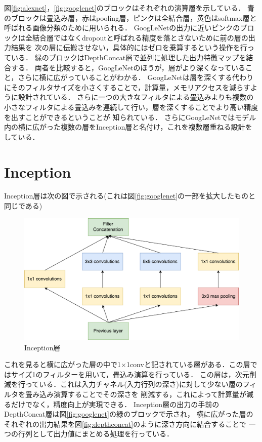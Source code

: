 {図\ref{fig:alexnet}，\ref{fig:googlenet}のブロックはそれぞれの演算層を示している．
青のブロックは畳込み層，赤はpooling層，ピンクは全結合層，黄色はsoftmax層と呼ばれる画像分類のために用いられる．
GoogLeNetの出力に近いピンクのブロックは全結合層ではなくdropoutと呼ばれる精度を落とさないために前の層の出力結果を
次の層に伝搬させない，具体的にはゼロを乗算するという操作を行っている．
緑のブロックはDepthConcat層で並列に処理した出力特徴マップを結合する．
両者を比較すると，GoogLeNetのほうが，層がより深くなっていること，さらに横に広がっていることがわかる．
GoogLeNetは層を深くする代わりにそのフィルタサイズを小さくすることで，計算量，メモリアクセスを減らすように設計されている．
さらに一つの大きなフィルタによる畳込みよりも複数の小さなフィルタによる畳込みを連続して行い，層を深くすることでより高い精度を出すことができるということが
知られている\cite{nin}．
さらにGoogLeNetではモデル内の横に広がった複数の層をInception層と名付け，これを複数層重ねる設計をしている．

\section{Inception}
\label{sec:inception}
Inception層は次の図で示される(これは図\ref{fig:googlenet}の一部を拡大したものと同じである)

\begin{figure}[h]
  \centering
  \includegraphics[scale=0.5]{./chap2/fig/inception.pdf}
  \caption{Inception層}
  \label{fig:inception}
\end{figure}

これを見ると横に広がった層の中で1$\times$1convと記されている層がある．この層ではサイズ1のフィルターを用いて，畳込み演算を行っている．
この層は，次元削減を行っている．これは入力チャネル(入力行列の深さ)に対して少ない層のフィルタを畳み込み演算することでその深さを
削減する，これによって計算量が減るだけでなく，精度向上が実現できる．
Inception層の出力の手前のDepthConcat層は図\ref{fig:googlenet}の緑のブロックで示され，
横に広がった層のそれぞれの出力結果を図\ref{fig:depthconcat}のように深さ方向に結合することで
一つの行列として出力値にまとめる処理を行っている．

}
